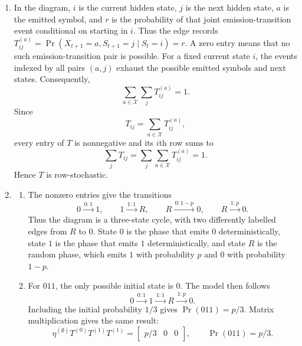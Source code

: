 \documentclass[11pt]{article}
\begin{document}
\begin{solution}[ex:p3-1]
    \begin{enumerate}
      \item In the diagram, $i$ is the current hidden state, $j$ is the next
        hidden state, $a$ is the emitted symbol, and $r$ is the probability of
        that joint emission-transition event conditional on starting in $i$.
        Thus the edge records
        $T^{(a)}_{ij}=\Pr(X_{t+1}=a,S_{t+1}=j\mid S_t=i)=r$.
        A zero entry means that no such emission-transition pair is possible.
        For a fixed current state $i$, the events indexed by all pairs $(a,j)$
        exhaust the possible emitted symbols and next states. Consequently,
        \[
          \sum_{a\in\mathcal X}\sum_j T^{(a)}_{ij}=1.
        \]
        Since
        \[
          T_{ij}=\sum_{a\in\mathcal X}T^{(a)}_{ij},
        \]
        every entry of $T$ is nonnegative and its $i$th row sums to
        \[
          \sum_jT_{ij}
            =\sum_j\sum_{a\in\mathcal X}T^{(a)}_{ij}=1.
        \]
        Hence $T$ is row-stochastic.

      \item
        \begin{enumerate}
          \item The nonzero entries give the transitions
            \[
              0\xrightarrow{\,0:1\,}1,
              \qquad
              1\xrightarrow{\,1:1\,}R,
              \qquad
              R\xrightarrow{\,0:1-p\,}0,
              \qquad
              R\xrightarrow{\,1:p\,}0.
            \]
            Thus the diagram is a three-state cycle, with two differently
            labelled edges from $R$ to $0$. State $0$ is the phase that emits
            $0$ deterministically, state $1$ is the phase that emits $1$
            deterministically, and state $R$ is the random phase, which emits
            $1$ with probability $p$ and $0$ with probability $1-p$.

          \item For $011$, the only possible initial state is $0$. The model
            then follows
            \[
              0\xrightarrow{\,0:1\,}1
               \xrightarrow{\,1:1\,}R
               \xrightarrow{\,1:p\,}0.
            \]
            Including the initial probability $1/3$ gives
            $\Pr(011)=p/3$. Matrix multiplication gives the same result:
            \[
              \eta^{(\emptyset)}T^{(0)}T^{(1)}T^{(1)}
                =\begin{bmatrix}p/3&0&0\end{bmatrix},
              \qquad
              \Pr(011)=p/3.
            \]


\end{enumerate}
\end{enumerate}
\end{solution}
\end{document}
